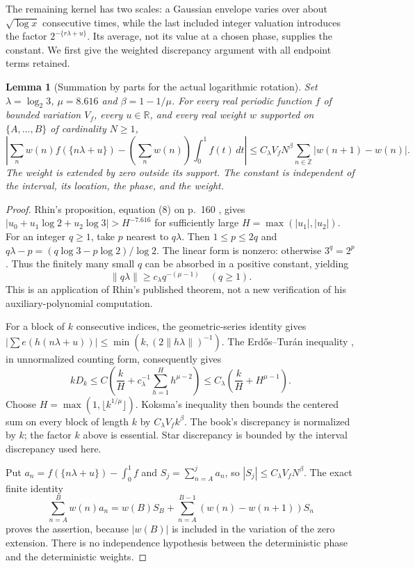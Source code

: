 \documentclass[11pt]{article}
\newtheorem{lemma}[proposition]{Lemma}
\theoremstyle{remark}\newtheorem{remark}[proposition]{Remark}
\newcommand{\ZZ}{\mathbb Z}
\begin{document}
The remaining kernel has two scales: a Gaussian envelope varies over
about $\sqrt{\log x}$ consecutive times, while the last included integer
valuation introduces the factor $2^{-\{r\lambda+u\}}$. Its average, not
its value at a chosen phase, supplies the constant. We first give the
weighted discrepancy argument with all endpoint terms retained.

\begin{lemma}[Summation by parts for the actual logarithmic rotation]
\label{lem:abel-rotation}
Set $\lambda=\log_2 3$, $\mu=8.616$ and $\beta=1-1/\mu$.
For every real periodic function $f$ of bounded variation $V_f$, every
$u\in\mathbb R$, and every real weight $w$ supported on
$\{A,\ldots,B\}$ of cardinality $N\ge1$,
\begin{equation}\label{eq:abel-rotation}
 \left|\sum_nw(n)f(\{n\lambda+u\})
       -\left(\sum_nw(n)\right)\int_0^1 f(t)\,dt\right|
 \le C_\lambda V_f N^\beta
       \sum_{n\in\ZZ}|w(n+1)-w(n)|.
\end{equation}
The weight is extended by zero outside its support. The constant is
independent of the interval, its location, the phase, and the weight.
\end{lemma}
\begin{proof}
Rhin's proposition, equation (8) on p.~160 \cite{Rhin1987}, gives
$|u_0+u_1\log2+u_2\log3|>H^{-7.616}$ for sufficiently large
$H=\max(|u_1|,|u_2|)$. For an integer $q\ge1$, take $p$ nearest
to $q\lambda$. Then $1\le p\le2q$ and
$q\lambda-p=(q\log3-p\log2)/\log2$. The linear form is nonzero:
otherwise $3^q=2^p$. Thus the finitely many small $q$ can be absorbed
in a positive constant, yielding
\[
 \|q\lambda\|\ge c_\lambda q^{-(\mu-1)}\quad(q\ge1).
\]
This is an application of Rhin's published theorem, not a new verification
of his auxiliary-polynomial computation.

For a block of $k$ consecutive indices, the geometric-series identity gives
$|\sum e(h(n\lambda+u))|\le\min(k,(2\|h\lambda\|)^{-1})$.
The Erd\H{o}s--Tur\'an inequality \cite[Ch.~2, Theorem~2.5,
pp.~112--114]{KN1974}, in unnormalized counting form, consequently gives
\[
 kD_k\le C\left(\frac{k}{H}
          +c_\lambda^{-1}\sum_{h=1}^H h^{\mu-2}\right)
 \le C_\lambda\left(\frac{k}{H}+H^{\mu-1}\right).
\]
Choose $H=\max(1,\lfloor k^{1/\mu}\rfloor)$.
Koksma's inequality \cite[Ch.~2, Theorem~5.1, p.~143]{KN1974}
then bounds the centered sum on every block of length $k$ by
$C_\lambda V_f k^\beta$. The book's discrepancy is normalized by
$k$; the factor $k$ above is essential. Star discrepancy is bounded
by the interval discrepancy used here.

Put $a_n=f(\{n\lambda+u\})-\int_0^1f$ and
$S_j=\sum_{n=A}^j a_n$, so $|S_j|\le C_\lambda V_f N^\beta$.
The exact finite identity
\[
 \sum_{n=A}^B w(n)a_n
 =w(B)S_B+\sum_{n=A}^{B-1}(w(n)-w(n+1))S_n
\]
proves the assertion, because $|w(B)|$ is included in the variation
of the zero extension. There is no independence hypothesis between
the deterministic phase and the deterministic weights.
\end{proof}
\end{document}
